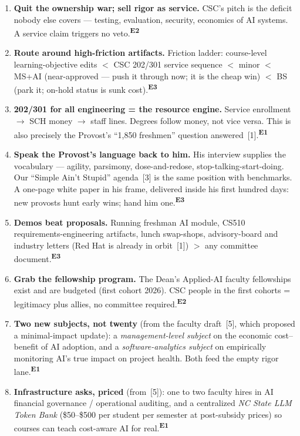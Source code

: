 \documentclass[11pt]{article}
\newcommand{\Ecite}{\textsuperscript{\color{wolf}\sffamily\bfseries E1}}   %
\newcommand{\Epeer}{\textsuperscript{\color{wolf}\sffamily\bfseries E2}}   %
\newcommand{\Epos}{\textsuperscript{\color{inkgray}\sffamily\bfseries E3}} %
\begin{document}
\begin{enumerate}[itemsep=3pt]
\item \textbf{Quit the ownership war; sell rigor as service.} CSC's pitch is the deficit nobody else covers --- testing, evaluation, security, economics of AI systems. A service claim triggers no veto.\Epeer
\item \textbf{Route around high-friction artifacts.} Friction ladder: course-level learning-objective edits $<$ CSC 202/301 service sequence $<$ minor $<$ MS+AI (near-approved --- push it through now; it is the cheap win) $<$ BS (park it; on-hold status is sunk cost).\Epos
\item \textbf{202/301 for all engineering = the resource engine.} Service enrollment $\to$ SCH money $\to$ staff lines. Degrees follow money, not vice versa. This is also precisely the Provost's ``1,850 freshmen'' question answered~[1].\Ecite
\item \textbf{Speak the Provost's language back to him.} His interview supplies the vocabulary --- agility, parsimony, dose-and-redose, stop-talking-start-doing. Our ``Simple Ain't Stupid'' agenda~[3] is the same position with benchmarks. A one-page white paper in his frame, delivered inside his first hundred days: new provosts hunt early wins; hand him one.\Epos
\item \textbf{Demos beat proposals.} Running freshman AI module, CS510 requirements-engineering artifacts, lunch swap-shops, advisory-board and industry letters (Red Hat is already in orbit~[1]) $>$ any committee document.\Epos
\item \textbf{Grab the fellowship program.} The Dean's Applied-AI faculty fellowships exist and are budgeted (first cohort 2026). CSC people in the first cohorts = legitimacy plus allies, no committee required.\Epeer
\item \textbf{Two new subjects, not twenty} (from the faculty draft~[5], which proposed a minimal-impact update): a \emph{management-level subject} on the economic cost--benefit of AI adoption, and a \emph{software-analytics subject} on empirically monitoring AI's true impact on project health. Both feed the empty rigor lane.\Ecite
\item \textbf{Infrastructure asks, priced} (from~[5]): one to two faculty hires in AI financial governance / operational auditing, and a centralized \emph{NC State LLM Token Bank} (\$50--\$500 per student per semester at post-subsidy prices) so courses can teach cost-aware AI for real.\Ecite
\end{enumerate}
\end{document}
